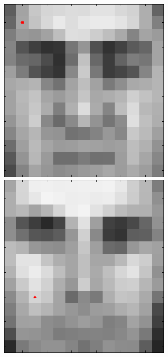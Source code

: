 \begin{figure}[ht]
 \includegraphics[width=\textwidth*11/100]{ch5/figures/XM2VTS_4_1.png}
 \includegraphics[width=\textwidth*11/100]{ch5/figures/XM2VTS_5_1.png}

\end{figure}
